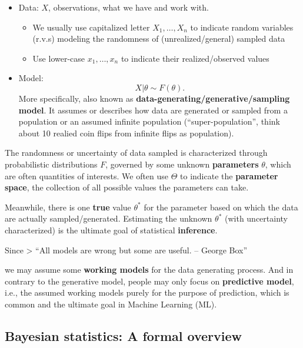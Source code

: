 \documentclass[
]{book}
\providecommand{\tightlist}{%
  \setlength{\itemsep}{0pt}\setlength{\parskip}{0pt}}
\begin{document}
\begin{itemize}
\tightlist
\item
  Data: \(X\), observations, what we have and work with.

  \begin{itemize}
  \tightlist
  \item
    We usually use capitalized letter \(X_1,\dots, X_n\) to indicate random variables (r.v.s) modeling the randomness of (unrealized/general) sampled data
  \item
    Use lower-case \(x_1,\dots, x_n\) to indicate their realized/observed values
  \end{itemize}
\item
  Model: \[X|\theta \sim F(\theta).\]
  More specifically, also known as \textbf{data-generating/generative/sampling model}. It assumes or describes how data are generated or sampled from a population or an assumed infinite population (``super-population'', think about 10 realied coin flips from infinite flips as population).
\end{itemize}

The randomness or uncertainty of data sampled is characterized through probabilistic distributions \(F\), governed by some unknown \textbf{parameters} \(\theta\), which are often quantities of interests. We often use \(\Theta\) to indicate the \textbf{parameter space}, the collection of all possible values the parameters can take.

Meanwhile, there is one \textbf{true} value \(\theta^*\) for the parameter based on which the data are actually sampled/generated. Estimating the unknown \(\theta^*\) (with uncertainty characterized) is the ultimate goal of statistical \textbf{inference}.

Since
\textgreater{} ``All models are wrong but some are useful. -- George Box''

we may assume some \textbf{working models} for the data generating process. And in contrary to the generative model, people may only focus on \textbf{predictive model}, i.e., the assumed working models purely for the purpose of prediction, which is common and the ultimate goal in Machine Learning (ML).

\hypertarget{bayesian-statistics-a-formal-overview}{%
\subsection{Bayesian statistics: A formal overview}\label{bayesian-statistics-a-formal-overview}}
\end{document}
